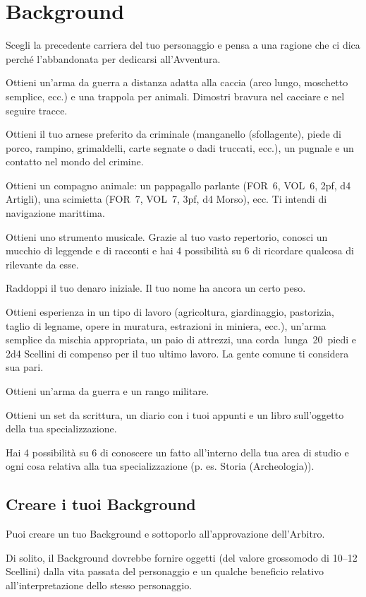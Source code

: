 \documentclass[itdr]{subfiles}
\begin{document}
\clearpage

\vfill
\section{Background}

Scegli la precedente carriera del tuo personaggio e pensa a una ragione che ci dica perché l’abbandonata per dedicarsi all'\mbox{Avventura}.

\vfill
{}
Ottieni un’arma da guerra a distanza adatta alla caccia (arco lungo, moschetto semplice, ecc.) e una trappola per animali. Dimostri bravura nel cacciare e nel seguire tracce.

\vfill
{}
Ottieni il tuo arnese preferito da criminale (manganello (sfollagente), piede di porco, rampino, grimaldelli, carte segnate o dadi truccati, ecc.), un pugnale e un contatto nel mondo del crimine.

\vfill
{}
Ottieni un compagno animale: un pappagallo parlante (FOR~6, VOL~6, 2pf, d4 Artigli), una scimietta (FOR~7, VOL~7, 3pf, d4 Morso), ecc. Ti intendi di navigazione marittima.

\vfill
{}
Ottieni uno strumento musicale. Grazie al tuo vasto repertorio, conosci un mucchio di leggende e di racconti e hai 4 possibilità su 6 di ricordare qualcosa di rilevante da esse.

\vfill
{}
Raddoppi il tuo denaro iniziale. Il tuo nome ha ancora un certo peso.

\vfill
{}
Ottieni esperienza in un tipo di lavoro (agricoltura, giardinaggio, pastorizia, taglio di legname, opere in muratura, estrazioni in miniera, ecc.), un’arma semplice da mischia appropriata, un paio di attrezzi, una \mbox{corda lunga 20 piedi} e 2d4 Scellini di compenso per il tuo ultimo lavoro. La gente \mbox{comune} ti considera sua pari.

\vfill
{}
Ottieni un’arma da guerra e un rango militare.

\vfill
{}
Ottieni un set da scrittura, un diario con i tuoi appunti e un libro sull’oggetto della tua specializzazione.

Hai 4 possibilità su 6 di conoscere un fatto all’interno della tua area di studio e ogni cosa relativa alla tua specializzazione (p. es. Storia (Archeologia)).

\break

\vfill
\begin{dbox}
\subsection*{Creare i tuoi Background}

Puoi creare un tuo Background e sottoporlo all’approvazione dell’Arbitro.

Di solito, il Background dovrebbe fornire oggetti (del valore grossomodo di 10--12 Scellini) dalla vita passata del personaggio e un qualche beneficio relativo all’interpretazione dello stesso personaggio.
\end{dbox}
\end{document}
